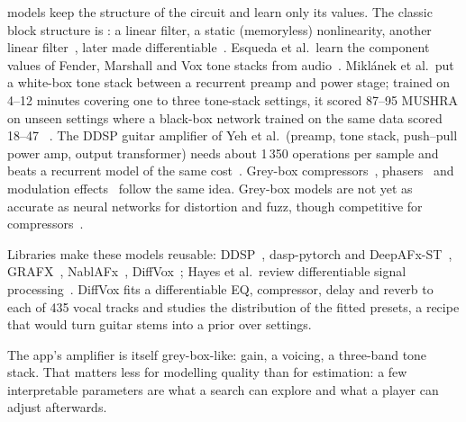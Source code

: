  models keep the structure of the circuit and learn only its
values. The classic block structure is : a linear
filter, a static (memoryless) nonlinearity, another linear
filter~\cite{eichas2017block,eichas2018graybox}, later made
differentiable~\cite{kuznetsov2020differentiable,colonel2022waveshapers}.
Esqueda et al.\ learn the component values of Fender, Marshall and Vox tone
stacks from audio~\cite{esqueda2021differentiable}. Miklánek et al.\ put a
white-box tone stack between a recurrent preamp and power stage; trained on
4--12 minutes covering one to three tone-stack settings, it scored 87--95 MUSHRA
on unseen settings where a black-box network trained on the same data scored
18--47 \reported~\cite{miklanek2023neural}. The DDSP guitar amplifier of Yeh et
al.\ (preamp, tone stack, push--pull power amp, output transformer) needs about
1\,350 operations per sample and beats a recurrent model of the same
cost~\cite{yeh2025ddsp}. Grey-box compressors~\cite{wright2022greybox},
phasers~\cite{carson2023differentiable} and modulation
effects~\cite{carson2026gradient} follow the same idea. Grey-box models are not
yet as accurate as neural networks for distortion and fuzz, though competitive
for compressors~\cite{comunita2025differentiable}.

Libraries make these models reusable: DDSP~\cite{engel2020ddsp}, dasp-pytorch
and DeepAFx-ST~\cite{steinmetz2022style}, GRAFX~\cite{lee2024grafx},
NablAFx~\cite{comunita2025nablafx}, DiffVox~\cite{yu2025diffvox}; Hayes et al.\
review differentiable signal processing~\cite{hayes2024review}. DiffVox fits a
differentiable EQ, compressor, delay and reverb to each of 435 vocal tracks and
studies the distribution of the fitted presets, a recipe that would turn guitar
stems into a prior over settings.

\begin{keyidea}
The app's amplifier is itself grey-box-like: gain, a voicing, a three-band tone
stack. That matters less for modelling quality than for estimation: a few
interpretable parameters are what a search can explore and what a player can
adjust afterwards.
\end{keyidea}
